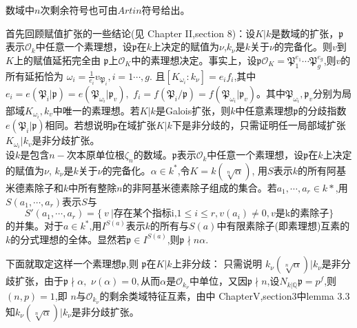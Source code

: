 \documentclass[UTF8]{article}
\begin{document}
数域中$n$次剩余符号也可由$Artin$符号给出。

首先回顾赋值扩张的一些结论(见\cite{Ne} Chapter II,section 8)：设$K|k$是数域的扩张，$\mathfrak{p}$表示$\mathcal{O}_{k}$中任意一个素理想，设$\mathfrak{p}$在$k$上决定的赋值为$\nu$,$k_{\nu}$是$k$关于$\nu$的完备化。则$v$到$K$上的赋值延拓完全由
$\mathfrak{p}$上$\mathcal{O}_{K}$中的素理想决定。事实上，设$\mathfrak{p}\mathcal{O}_{K}=\mathfrak{P}_{1}^{e_{1}}\cdots\mathfrak{P}_{g}^{e_{g}}$,则$v$的所有延拓恰为
$\omega_{i}=\frac{1}{e_{i}}v_{\mathfrak{P}_{i}},i=1\cdots,g.$
且$[K_{\omega_{i}}:k_{\nu}]=e_{i}f_{i}$,其中$e_{i}=e(\mathfrak{P}_{i}|\mathfrak{p})=e(\mathfrak{P}_{\omega_{i}}|\mathfrak{p}_{v}),$ $f_{i}=f(\mathfrak{P}_{i}/\mathfrak{p})=f(\mathfrak{P}_{\omega_{i}}|\mathfrak{p}_{v})$。其中$\mathfrak{P}_{\omega_{i}},\mathfrak{p}_{v}$分别为局部域$K_{\omega_{i}},k_{v}$中唯一的素理想。若$K|k$是Galois扩张，则$k$中任意素理想$\mathfrak{p}$的分歧指数$e(\mathfrak{P}_{i}|\mathfrak{p})$相同。若想说明$\mathfrak{p}$在域扩张$K|k$下是非分歧的，只需证明任一局部域扩张$K_{\omega_{i}}|k_{v}$是非分歧扩张。\\


设$k$是包含$n-$次本原单位根$\zeta_{n}$的数域。$\mathfrak{p}$表示$\mathcal{O}_{k}$中任意一个素理想，设$\mathfrak{p}$在$k$上决定的赋值为$\nu$,
$k_{\nu}$是$k$关于$\nu$的完备化。$\alpha\in k^{*}$,令$K=k(\sqrt[n]{\alpha})$,
用$S$表示$k$的所有阿基米德素除子和$k$中所有整除$n$的非阿基米德素除子组成的集合。若$a_{1},\cdots,a_{r}\in k*$,用$S(a_{1},\cdots,a_{r})$表示$S$与
$$S'(a_{1},\cdots,a_{r})=\{\ v\ |\text{存在某个指标i,}1\leq i\leq r,v(a_{i})\neq 0,v\text{是k的素除子}\}$$
的并集。对于$a\in k^{*}$,用$I^{S(a)}$表示$k$的所有与$S(a)$中有限素除子(即素理想)互素的$k$的分式理想的全体。显然若$\mathfrak{p}\in I^{S(a)}$,则$\mathfrak{p}\nmid n\alpha.$


下面就取定这样一个素理想$\mathfrak{p}$,则
$\mathfrak{p}$在$K|k$上非分歧：
只需说明
$k_{\nu}(\sqrt[n]{\alpha})|k_{\nu}$是非分歧扩张，由于$\mathfrak{p}\nmid \alpha,$ $\nu(\alpha)=0,$从而$\alpha$是$\mathcal{O}_{k_{\nu}}$中单位，又因$\mathfrak{p}\nmid n$,设$N_{k|\mathbb{Q}}\mathfrak{p}=p^{f}$,则$(n,p)=1$,即 $n$与$\mathcal{O}_{k_{\nu}}$的剩余类域特征互素，由\cite{Ne}中
ChapterV,section3中lemma 3.3知$k_{\nu}(\sqrt[n]{\alpha})|k_{\nu}$是非分歧扩张。
\end{document}

